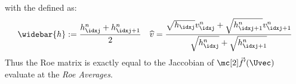 \begin{examplebox}
\begin{example}
\begin{align}
       \end{align}
       with the  defined as:
       \begin{align}
         \widebar{h}:=\frac{h_{\idxj}^{n}+h_{\idxj+1}^{n}}{2}&&\widehat{v}=\frac{\sqrt{h_{\idxj}}v_{\idxj}^{n}+\sqrt{h_{\idxj+1}^{n}}v_{\idxj+1}^{n}}{\sqrt{h_{\idxj}^{n}}+\sqrt{h_{\idxj+1}^{n}}}
       \end{align}
       Thus the Roe matrix is exactly equal to the Jaccobian of $\fluxvec'(\Uvec)$  evaluate at the \textit{Roe Averages}.
    \end{example}
\end{examplebox}
\begin{examplebox}\nospacing
    \begin{example}\label{example:proposition:roe_matrix_euler}\leavevmode\\
    \end{example}
\end{examplebox}
